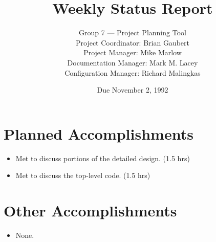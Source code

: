 


\title{Weekly Status Report}

\author{Group 7 --- Project Planning Tool\\
Project Coordinator: Brian Gaubert\\
Project Manager: Mike Marlow\\
Documentation Manager: Mark M. Lacey\\
Configuration Manager: Richard Malingkas}

\date{Due November 2, 1992}

\maketitle

%
%
%
\section{Planned Accomplishments}
\begin{itemize}
	\item Met to discuss portions of the detailed design. (1.5 hrs)
	\item Met to discuss the top-level code. (1.5 hrs)
\end{itemize}

%
%
%
\section{Other Accomplishments}
\begin{itemize}
	\item None.
\end{itemize}

%
%
%
